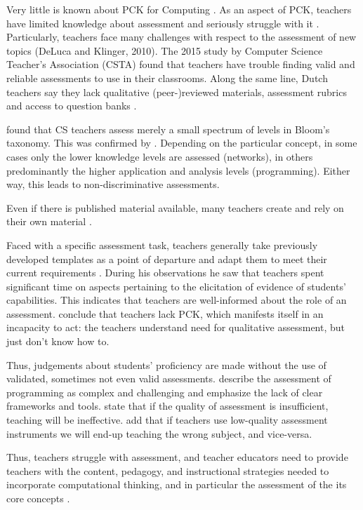 Very little is known about PCK for Computing \cite{Yadav2016}. As an aspect of PCK, teachers have limited knowledge about assessment and seriously struggle with it \cite{popham2009assessment}. Particularly, teachers face many challenges with respect to the assessment of new topics (DeLuca and Klinger, 2010). The 2015 study by Computer Science Teacher's Association (CSTA) found that teachers have trouble finding valid and reliable assessments to use in their classrooms. Along the same line, Dutch teachers say they lack qualitative (peer-)reviewed materials, assessment rubrics and access to question banks \cite{tolboom2014informatica}.


 found that CS teachers assess merely a small spectrum of levels in Bloom's taxonomy. This was confirmed by . Depending on the particular concept, in some cases only the lower knowledge levels are assessed (networks), in others predominantly the higher application and analysis levels (programming). Either way, this leads to non-discriminative assessments.


Even if there is published material available, many teachers create and rely on their own material \cite{popham2009assessment}.

Faced with a specific assessment task, teachers generally take previously developed templates as a point of departure and adapt them to meet their current requirements \cite{hermansen2014reworking}. During his observations he saw that teachers spent significant time on aspects pertaining to the elicitation of evidence of students' capabilities. This indicates that teachers are well-informed about the role of an assessment.  conclude that teachers lack PCK, which manifests itself in an incapacity to act: the teachers understand need for qualitative assessment, but just don't know how to.



Thus, judgements about students' proficiency are made without the use of validated, sometimes not even valid assessments.  describe the assessment of programming as complex and challenging and emphasize the lack of clear frameworks and tools.  state that if the quality of assessment is insufficient, teaching will be ineffective.  add that if teachers use low-quality assessment instruments we will end-up teaching the wrong subject, and vice-versa.


Thus, teachers struggle with assessment, and teacher educators need to provide teachers with the content, pedagogy, and instructional strategies needed to incorporate computational thinking, and in particular the assessment of the its core concepts \cite{Yadav2017CTteacherEd}.







